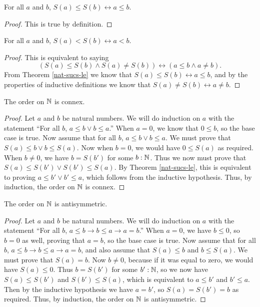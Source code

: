 \documentclass[../math.tex]{subfiles}
\begin{document}
\begin{theorem} \label{nat-sucs-le}
    For all $a$ and $b$, $S(a) \leq S(b) \leftrightarrow a \leq b$.
\end{theorem}
\begin{proof}
    This is true by definition.
\end{proof}

\begin{theorem} \label{nat-sucs-lt}
    For all $a$ and $b$, $S(a) < S(b) \leftrightarrow a < b$.
\end{theorem}
\begin{proof}
    This is equivalent to saying
    \[
        (S(a) \leq S(b) \wedge S(a) \neq S(b)) \leftrightarrow
        (a \leq b \wedge a \neq b).
    \]
    From Theorem \ref{nat-sucs-le} we know that $S(a) \leq S(b) \leftrightarrow
    a \leq b$, and by the properties of inductive definitions we know that $S(a)
    \neq S(b) \leftrightarrow a \neq b$.
\end{proof}

\begin{instance}
    The order on $\mathbb{N}$ is connex.
\end{instance}
\begin{proof}
    Let $a$ and $b$ be natural numbers.  We will do induction on $a$ with the
    statement ``For all $b$, $a \leq b \vee b \leq a$.''  When $a = 0$, we know
    that $0 \leq b$, so the base case is true.  Now assume that for all $b$, $a
    \leq b \vee b \leq a$.  We must prove that $S(a) \leq b \vee b \leq S(a)$.
    Now when $b = 0$, we would have $0 \leq S(a)$ as required.  When $b \neq 0$,
    we have $b = S(b')$ for some $b : \mathbb{N}$.  Thus we now must prove that $S(a)
    \leq S(b') \vee S(b') \leq S(a)$.  By Theorem \ref{nat-sucs-le}, this is
    equivalent to proving $a \leq b' \vee b' \leq a$, which follows from the
    inductive hypothesis.  Thus, by induction, the order on $\mathbb{N}$ is connex.
\end{proof}

\begin{instance}
    The order on $\mathbb{N}$ is antisymmetric.
\end{instance}
\begin{proof}
    Let $a$ and $b$ be natural numbers.  We will do induction on $a$ with the
    statement ``For all $b$, $a \leq b \rightarrow b \leq a \rightarrow a =
    b$.''  When $a = 0$, we have $b \leq 0$, so $b = 0$ as well, proving that $a
    = b$, so the base case is true.  Now assume that for all $b$, $a \leq b
    \rightarrow b \leq a \rightarrow a = b$, and also assume that $S(a) \leq b$
    and $b \leq S(a)$.  We must prove that $S(a) = b$.  Now $b \neq 0$, because
    if it was equal to zero, we would have $S(a) \leq 0$.  Thus $b = S(b')$ for
    some $b' : \mathbb{N}$, so we now have $S(a) \leq S(b')$ and $S(b') \leq S(a)$,
    which is equivalent to $a \leq b'$ and $b' \leq a$.  Then by the inductive
    hypothesis we have $a = b'$, so $S(a) = S(b') = b$ as required.  Thus, by
    induction, the order on $\mathbb{N}$ is antisymmetric.
\end{proof}
\end{document}
